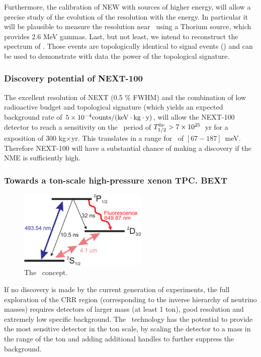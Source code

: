 Furthermore, the calibration of NEW with 
sources of higher energy, will allow a precise study of the evolution of the resolution with the energy. 
In particular it will be plausible to measure the resolution near \Qbb\ using a Thorium source, which provides 2.6 MeV gammas. Last, but not least, we intend to 
reconstruct the spectrum of \bbtnu. Those events are topologically identical to signal events (\bbonu) and can be used to demonstrate with data the power of the topological signature. 

\subsubsection*{Discovery potential of NEXT-100}

The excellent resolution of NEXT (0.5 \% FWHM) and the combination of low radioactive budget and topological signature (which yields an expected background rate of $5 \times 10^{-4} \rm counts/(keV \cdot kg \cdot y)$, will allow the NEXT-100 detector to reach a sensitivity on the \bbonu\ period of $T_{1/2}^{0\nu} > 7 \times 10^{25}$~yr for a exposition of 300 kg$\times$yr. This translates in a range for \mbb\ of $[67-187]$~meV. Therefore NEXT-100 will have a substantial chance of making a discovery if the NME is sufficiently high. 

\subsubsection*{Towards a ton-scale high-pressure xenon TPC. BEXT}

\begin{figure}
\centering
\includegraphics[width=0.55\textwidth]{img/levelscheme2.pdf}
\caption{The \BATA\ concept.} \label{fig.BATA}
\end{figure}

If no discovery is made by the current generation of experiments, the full exploration of the CRR region (corresponding to the inverse hierarchy of neutrino masses) requires detectors of larger mass (at least 1 ton), good resolution and extremely low specific background. The \HPXE\ technology has the potential to provide the most sensitive detector in the ton scale, by scaling the detector to a mass in the range of the ton and adding additional handles to further suppress the background. 

